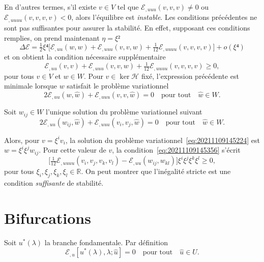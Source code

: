 \documentclass[12pt, final]{amsart}
\newcommand{\reals}{\mathbb{R}}
\begin{document}
En d'autres termes, s'il existe \(v∈ V\) tel que
\(ℰ_{,uuu}(v, v, v)≠0\) ou
\(ℰ_{,uuuu}(v, v, v, v)<0\), alors l'équilibre est
\emph{instable}. Les conditions précédentes ne sont pas suffisantes pour
assurer la stabilité. En effet, supposant ces conditions remplies, on prend
maintenant \(η=ξ²\)
\begin{equation}
  Δℰ
  =\tfrac12ξ⁴\bigl[ℰ_{,uu}(w, w)+ℰ_{,uuu}(v, v, w)
  +\tfrac1{12}ℰ_{,uuuu}(v, v, v, v)\bigr]+o(ξ⁴)
\end{equation}
et on obtient la condition nécessaire supplémentaire
\begin{equation}
  \label{eq:20211109145356}
  ℰ_{,uu}(v, v)+ℰ_{,uuu}(v, v, w)
  +\tfrac1{12}ℰ_{,uuuu}(v, v, v, v)≥0,
\end{equation}
pour tous \(v∈ V\) et \(w∈ W\). Pour \(v∈\ker\mathcal H\) fixé,
l'expression précédente est minimale lorsque \(w\) satisfait le problème
variationnel
\begin{equation}
  \label{eq:20211109145224}
  2ℰ_{,uu}(w, \hat{w})+ℰ_{,uuu}(v, v, \hat{w})=0
  \quad\text{pour tout}\quad
  \hat{w}∈ W.
\end{equation}

Soit \(w_{ij}∈ W\) l'unique solution du problème variationnel suivant
\begin{equation}
  \label{eq:20211221155859}
  2ℰ_{,uu}(w_{ij}, \hat{w})
  +ℰ_{,uuu}(v_i, v_j, \hat{w})=0
  \quad\text{pour tout}\quad\hat{w}∈ W.
\end{equation}

Alors, pour \(v=ξ^i v_i\), la solution du problème
variationnel~\eqref{eq:20211109145224} est \(w=ξ^iξ^jw_{ij}\). Pour cette
valeur de \(v\), la condition~\eqref{eq:20211109145356} s'écrit
\begin{equation}
  \bigl[\tfrac1{12}ℰ_{,uuuu}(v_i, v_j, v_k, v_l)
  -ℰ_{,uu}(w_{ij}, w_{kl})\bigr]
  ξ^iξ^jξ^kξ^l≥ 0,
\end{equation}
pour tous \(ξ_i, ξ_j, ξ_k, ξ_l∈\reals\). On peut montrer que
l'inégalité stricte est une condition \emph{suffisante} de stabilité.

\section{Bifurcations}

Soit \(u^\ast(\lambda)\) la branche fondamentale. Par définition
\begin{equation}
  ℰ_{,u}[u^\ast(\lambda), \lambda;\hat{u}]=0
  \quad\text{pour tout}\quad\hat{u}∈ U.
\end{equation}
\end{document}

